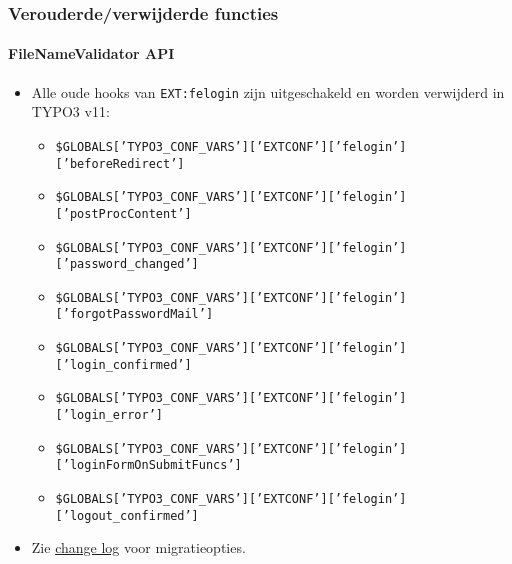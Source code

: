\begin{frame}[fragile]
	\frametitle{Verouderde/verwijderde functies}
	\framesubtitle{FileNameValidator API}

	\lstset{basicstyle=\tiny\ttfamily}

	\begin{itemize}
		\item Alle oude hooks van \texttt{EXT:felogin} zijn uitgeschakeld en
			worden verwijderd in TYPO3 v11:

			\begin{itemize}\tiny
				\item \texttt{\$GLOBALS['TYPO3\_CONF\_VARS']['EXTCONF']['felogin']['beforeRedirect']}
				\item \texttt{\$GLOBALS['TYPO3\_CONF\_VARS']['EXTCONF']['felogin']['postProcContent']}
				\item \texttt{\$GLOBALS['TYPO3\_CONF\_VARS']['EXTCONF']['felogin']['password\_changed']}
				\item \texttt{\$GLOBALS['TYPO3\_CONF\_VARS']['EXTCONF']['felogin']['forgotPasswordMail']}
				\item \texttt{\$GLOBALS['TYPO3\_CONF\_VARS']['EXTCONF']['felogin']['login\_confirmed']}
				\item \texttt{\$GLOBALS['TYPO3\_CONF\_VARS']['EXTCONF']['felogin']['login\_error']}
				\item \texttt{\$GLOBALS['TYPO3\_CONF\_VARS']['EXTCONF']['felogin']['loginFormOnSubmitFuncs']}
				\item \texttt{\$GLOBALS['TYPO3\_CONF\_VARS']['EXTCONF']['felogin']['logout\_confirmed']}
			\end{itemize}

		\item Zie
			\href{https://docs.typo3.org/c/typo3/cms-core/master/en-us/Changelog/10.4/Deprecation-88740-DeprecateFeloginPibasePlugin.html}{change log}
			voor migratieopties.
	\end{itemize}

\end{frame}

